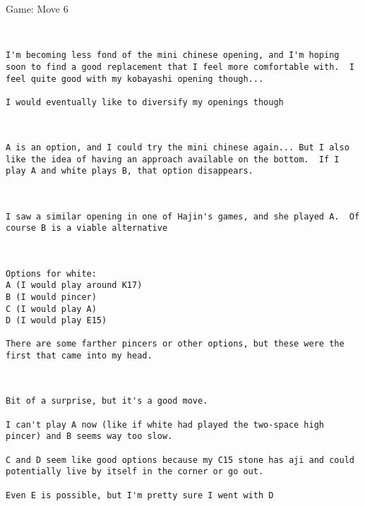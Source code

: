 \documentclass{article}
\begin{document}
\begin{section}{Game: Move 6}
\begin{center}
\cleargoban
{}
\white{}
\showfullgoban
\\\begin{lstlisting}
I'm becoming less fond of the mini chinese opening, and I'm hoping soon to find a good replacement that I feel more comfortable with.  I feel quite good with my kobayashi opening though...

I would eventually like to diversify my openings though\end{lstlisting}
\end{center}
\begin{center}
\cleargoban
{}
\showfullgoban
\\\begin{lstlisting}
A is an option, and I could try the mini chinese again... But I also like the idea of having an approach available on the bottom.  If I play A and white plays B, that option disappears.\end{lstlisting}
\end{center}
\begin{center}
\cleargoban
{}
\showfullgoban
\\\begin{lstlisting}
I saw a similar opening in one of Hajin's games, and she played A.  Of course B is a viable alternative\end{lstlisting}
\end{center}
\begin{center}
\cleargoban
{}
\showfullgoban
\\\begin{lstlisting}
Options for white:
A (I would play around K17)
B (I would pincer)
C (I would play A)
D (I would play E15)

There are some farther pincers or other options, but these were the first that came into my head.\end{lstlisting}
\end{center}
\begin{center}
\cleargoban
{}
\showfullgoban
\\\begin{lstlisting}
Bit of a surprise, but it's a good move.

I can't play A now (like if white had played the two-space high pincer) and B seems way too slow.

C and D seem like good options because my C15 stone has aji and could potentially live by itself in the corner or go out.

Even E is possible, but I'm pretty sure I went with D\end{lstlisting}
\end{center}
\end{section}
\end{document}
